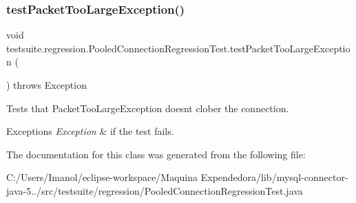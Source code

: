 \subsubsection{\texorpdfstring{test\+Packet\+Too\+Large\+Exception()}{testPacketTooLargeException()}}
{\footnotesize\ttfamily void testsuite.\+regression.\+Pooled\+Connection\+Regression\+Test.\+test\+Packet\+Too\+Large\+Exception (\begin{DoxyParamCaption}{ }\end{DoxyParamCaption}) throws Exception}

Tests that Packet\+Too\+Large\+Exception doesn\textquotesingle{}t clober the connection.


\begin{DoxyExceptions}{Exceptions}
{\em Exception} & if the test fails. \\
\hline
\end{DoxyExceptions}


The documentation for this class was generated from the following file\+:\begin{DoxyCompactItemize}
\item 
C\+:/\+Users/\+Imanol/eclipse-\/workspace/\+Maquina Expendedora/lib/mysql-\/connector-\/java-\/5../src/testsuite/regression/Pooled\+Connection\+Regression\+Test.\+java\end{DoxyCompactItemize}
